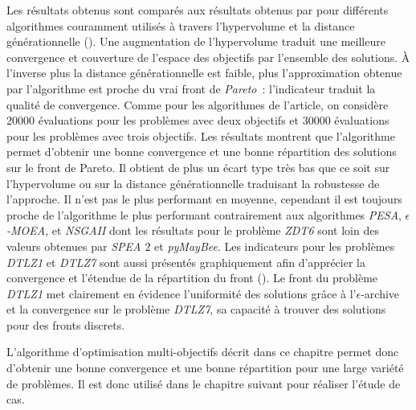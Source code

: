Les résultats obtenus sont comparés aux résultats obtenus par \textcite{Deb2005501}
pour différents algorithmes couramment utilisés à travers l’hypervolume et la
distance générationnelle (). Une augmentation de l’hypervolume
traduit une meilleure convergence et couverture de l’espace des objectifs par l’ensemble des solutions.
À l’inverse plus la distance générationnelle est faible, plus l’approximation obtenue par l’algorithme
est proche du vrai front de \textit{Pareto}~: l’indicateur traduit la qualité de convergence.
Comme pour les algorithmes de l’article, on considère \num{20000} évaluations pour les problèmes avec deux
objectifs et \num{30000} évaluations pour les problèmes avec trois objectifs.
Les résultats montrent que l’algorithme permet d’obtenir une bonne convergence et une bonne
répartition des solutions sur le front de Pareto. Il obtient de plus un écart type très bas
que ce soit sur l’hypervolume ou sur la distance générationnelle traduisant la robustesse de
l’approche. Il n’est pas le plus performant en moyenne, cependant il est toujours proche de l’algorithme le plus
performant contrairement aux algorithmes \textit{PESA}, \textit{$\epsilon$-MOEA}, et \textit{NSGAII} dont les
résultats pour le problème \textit{ZDT6} sont loin des valeurs obtenues par \textit{SPEA $2$} et
\textit{pyMayBee}.
Les indicateurs pour les problèmes \textit{DTLZ1} et \textit{DTLZ7} sont aussi
présentés graphiquement afin d’apprécier la convergence et l’étendue de la répartition du front
(). Le front du problème \textit{DTLZ1} met
clairement en évidence l’uniformité des solutions grâce à l’$\epsilon$-archive et la
convergence sur le problème \textit{DTLZ7}, sa capacité à trouver des solutions pour des fronts discrets.

L’algorithme d’optimisation multi-objectifs décrit dans ce chapitre permet donc
d’obtenir une bonne convergence et une bonne répartition pour une large variété de problèmes.
Il est donc utilisé dans le chapitre suivant pour réaliser l’étude de cas.

